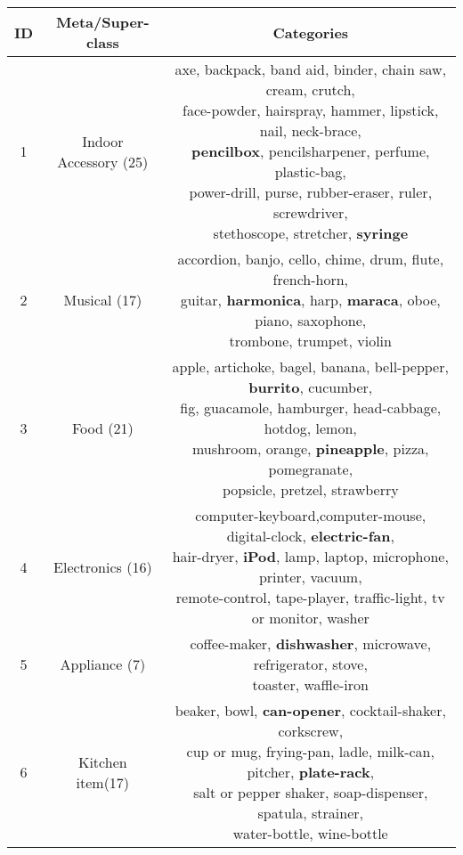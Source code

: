 \documentclass[runningheads]{llncs}
\begin{document}
\begin{table*}[!t]
  \begin{center}
    \begin{tabular}{|c|c|c|}
    \hline
ID&Meta/Super-class & Categories  \\
    \hline\hline
1&\makecell{Indoor\\Accessory (25)} &	\makecell{axe,	backpack,	band aid,	binder,	chain saw,	cream,	crutch,\\face-powder,	hairspray,	hammer, lipstick, nail,	neck-brace, \\ \textbf{pencilbox},	pencilsharpener,	perfume,	plastic-bag, \\power-drill, purse, rubber-eraser,	ruler,	screwdriver, \\stethoscope, stretcher, \textbf{syringe}} \\ \hline	

2&Musical (17) & \makecell{accordion,	banjo,	cello,	chime,	drum,	flute,	french-horn,\\guitar, \textbf{harmonica},	harp,	\textbf{maraca},	oboe, piano,	saxophone,	\\trombone,	trumpet,	violin} \\ \hline

3&Food (21)&\makecell{apple,	artichoke,	bagel,	banana,	bell-pepper,	\textbf{burrito},	cucumber,	\\fig,	guacamole,	hamburger,	head-cabbage,	hotdog,	lemon,	\\mushroom,	orange,	\textbf{pineapple},	pizza,	pomegranate,\\	popsicle,	pretzel,	strawberry} \\ \hline

4&Electronics (16)&\makecell{computer-keyboard,computer-mouse,	digital-clock,	\textbf{electric-fan},	\\hair-dryer,	\textbf{iPod},	lamp,	laptop, microphone,	printer, vacuum,\\	remote-control,	tape-player, traffic-light,	tv or monitor, washer} \\ \hline

5&Appliance (7)&\makecell{coffee-maker,	\textbf{dishwasher},	microwave,	refrigerator,	stove,	\\toaster,	waffle-iron} \\ \hline

6&\makecell{Kitchen\\item}(17)&\makecell{beaker,	bowl,	\textbf{can-opener},	cocktail-shaker,	corkscrew,	\\cup or mug,	frying-pan,	ladle,	milk-can,	pitcher,	\textbf{plate-rack},\\	 salt or pepper shaker,	soap-dispenser,	spatula,	strainer,	\\water-bottle,	wine-bottle} \\ \hline


\end{tabular}
\end{center}
\end{table*}
\end{document}
